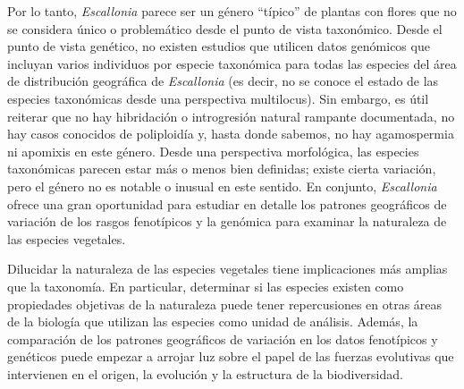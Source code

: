 \documentclass[
  11pt,
]{article}
\begin{document}
Por lo tanto, \emph{Escallonia} parece ser un género ``típico'' de plantas con flores que no se considera único o problemático desde el punto de vista taxonómico. Desde el punto de vista genético, no existen estudios que utilicen datos genómicos que incluyan varios individuos por especie taxonómica para todas las especies del área de distribución geográfica de \emph{Escallonia} (es decir, no se conoce el estado de las especies taxonómicas desde una perspectiva multilocus). Sin embargo, es útil reiterar que no hay hibridación o introgresión natural rampante documentada, no hay casos conocidos de poliploidía y, hasta donde sabemos, no hay agamospermia ni apomixis en este género. Desde una perspectiva morfológica, las especies taxonómicas parecen estar más o menos bien definidas; existe cierta variación, pero el género no es notable o inusual en este sentido. En conjunto, \emph{Escallonia} ofrece una gran oportunidad para estudiar en detalle los patrones geográficos de variación de los rasgos fenotípicos y la genómica para examinar la naturaleza de las especies vegetales.

Dilucidar la naturaleza de las especies vegetales tiene implicaciones más amplias que la taxonomía. En particular, determinar si las especies existen como propiedades objetivas de la naturaleza puede tener repercusiones en otras áreas de la biología que utilizan las especies como unidad de análisis. Además, la comparación de los patrones geográficos de variación en los datos fenotípicos y genéticos puede empezar a arrojar luz sobre el papel de las fuerzas evolutivas que intervienen en el origen, la evolución y la estructura de la biodiversidad.

\setcounter{figure}{0}
\setcounter{table}{0}
\let\thefigure=\oldthefigure
\let\thetable=\oldthetable
\end{document}
